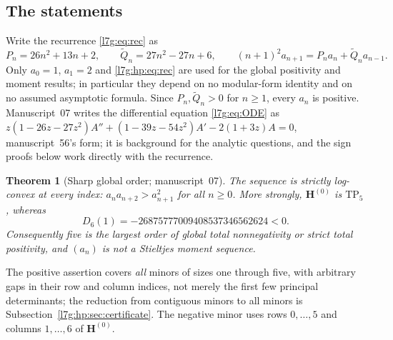 \documentclass[11pt,letterpaper]{article}
\newtheorem{theorem}{Theorem}[section]
\theoremstyle{remark}\newtheorem{remark}[theorem]{Remark}
\newcommand{\TP}{\mathrm{TP}}\newcommand{\TN}{\mathrm{TN}}
\newcounter{l7gtrsavedeq}
\begin{document}
\subsection{The statements}\label{l7g:hp:sec:statements}
Write the recurrence \eqref{l7g:eq:rec} as
\begin{equation}\label{l7g:hp:eq:rec}
 P_n=26n^2+13n+2,\qquad \widetilde Q_n=27n^2-27n+6,\qquad
 (n+1)^2a_{n+1}=P_na_n+\widetilde Q_na_{n-1}.
\end{equation}
Only $a_0=1$, $a_1=2$ and \eqref{l7g:hp:eq:rec} are used for the global
positivity and moment results; in particular they depend on no
modular-form identity and on no assumed asymptotic formula. Since
$P_n,\widetilde Q_n>0$ for $n\ge1$, every $a_n$ is positive. Manuscript~07
writes the differential equation \eqref{l7g:eq:ODE} as
$z(1-26z-27z^2)A''+(1-39z-54z^2)A'-2(1+3z)A=0$, manuscript~56's form; it
is background for the analytic questions, and the sign proofs below work
directly with the recurrence.

\begin{theorem}[Sharp global order; manuscript~07]\label{l7g:hp:thm:sharp}
The sequence is strictly log-convex at every index:
$a_na_{n+2}>a_{n+1}^2$ for all $n\ge0$. More strongly, $\mathbf H^{(0)}$ is
$\TP_5$, whereas
\begin{equation}\label{l7g:hp:eq:negative}
 D_6(1)=-26875777009408537346562624<0.
\end{equation}
Consequently five is the largest order of global total nonnegativity or
strict total positivity, and $(a_n)$ is not a Stieltjes moment sequence.
\end{theorem}
The positive assertion covers \emph{all} minors of sizes one through five,
with arbitrary gaps in their row and column indices, not merely the first
few principal determinants; the reduction from contiguous minors to all
minors is Subsection~\ref{l7g:hp:sec:certificate}. The negative minor uses
rows $0,\dots,5$ and columns $1,\dots,6$ of $\mathbf H^{(0)}$.
\end{document}
